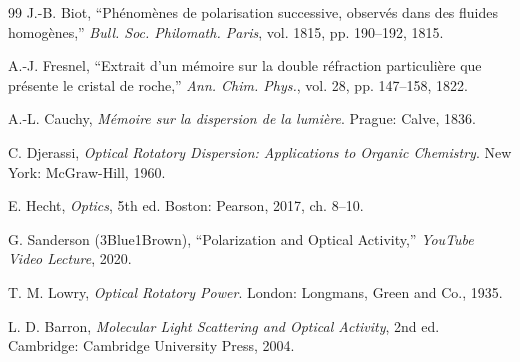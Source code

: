 \documentclass[twocolumn,10pt,a4paper]{article}
\begin{document}
\begin{thebibliography}{99}
\small
\setlength{\itemsep}{1pt}
\setlength{\parskip}{0pt}
J.-B. Biot, ``Phénomènes de polarisation successive, observés dans des fluides homogènes,'' \textit{Bull. Soc. Philomath. Paris}, vol. 1815, pp. 190--192, 1815.

A.-J. Fresnel, ``Extrait d'un mémoire sur la double réfraction particulière que présente le cristal de roche,'' \textit{Ann. Chim. Phys.}, vol. 28, pp. 147--158, 1822.

A.-L. Cauchy, \textit{Mémoire sur la dispersion de la lumière}. Prague: Calve, 1836.

C. Djerassi, \textit{Optical Rotatory Dispersion: Applications to Organic Chemistry}. New York: McGraw-Hill, 1960.

E. Hecht, \textit{Optics}, 5th ed. Boston: Pearson, 2017, ch. 8--10.

G. Sanderson (3Blue1Brown), ``Polarization and Optical Activity,'' \textit{YouTube Video Lecture}, 2020.

T. M. Lowry, \textit{Optical Rotatory Power}. London: Longmans, Green and Co., 1935.

L. D. Barron, \textit{Molecular Light Scattering and Optical Activity}, 2nd ed. Cambridge: Cambridge University Press, 2004.
\end{thebibliography}
\end{document}
